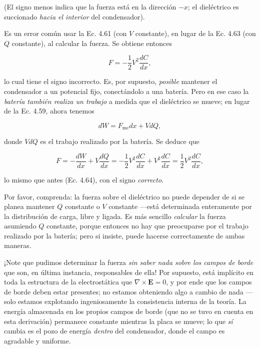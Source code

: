 \documentclass[12pt,a4paper]{report}
\newcommand{\esp}{\vspace{0.5cm}}
\begin{document}
	\esp
	
	\noindent (El signo menos indica que la fuerza está en la dirección $-x$; el dieléctrico es succionado \textit{hacia el interior} del condensador).
	
	\esp
	
	Es un error común usar la Ec. 4.61 (con $V$ constante), en lugar de la Ec. 4.63 (con $Q$ constante), al calcular la fuerza. Se obtiene entonces
	
	\esp
	
	\begin{equation*}
		F = -\frac{1}{2} V^2 \frac{dC}{dx} ,
	\end{equation*}
	
	\esp
	
	\noindent lo cual tiene el signo incorrecto. Es, por supuesto, \textit{posible} mantener el condensador a un potencial fijo, conectándolo a una batería. Pero en ese caso la \textit{batería también realiza un trabajo} a medida que el dieléctrico se mueve; en lugar de la Ec. 4.59, ahora tenemos
	
	\esp
	
	\begin{equation}
		dW = F_{\text{me}} dx + V dQ , \tag{4.66}
	\end{equation}
	
	\esp
	
	\noindent donde $V dQ$ es el trabajo realizado por la batería. Se deduce que
	
	\esp
	
	\begin{equation}
		F = -\frac{dW}{dx} + V \frac{dQ}{dx} = -\frac{1}{2} V^2 \frac{dC}{dx} + V^2 \frac{dC}{dx} = \frac{1}{2} V^2 \frac{dC}{dx} , \tag{4.67}
	\end{equation}
	
	\esp
	
	\noindent lo mismo que antes (Ec. 4.64), con el signo \textit{correcto}.
	
	\esp
	
	Por favor, comprenda: la fuerza sobre el dieléctrico no puede depender de si se planea mantener $Q$ constante o $V$ constante —está determinada enteramente por la distribución de carga, libre y ligada. Es más sencillo \textit{calcular} la fuerza asumiendo $Q$ constante, porque entonces no hay que preocuparse por el trabajo realizado por la batería; pero si insiste, puede hacerse correctamente de ambas maneras.
	
	\esp
	
	¡Note que pudimos determinar la fuerza \textit{sin saber nada sobre los campos de borde} que son, en última instancia, responsables de ella! Por supuesto, está implícito en toda la estructura de la electrostática que $\nabla \times \mathbf{E} = 0$, y por ende que los campos de borde deben estar presentes; no estamos obteniendo algo a cambio de nada —solo estamos explotando ingeniosamente la consistencia interna de la teoría. La energía almacenada en los propios campos de borde (que no se tuvo en cuenta en esta derivación) permanece constante mientras la placa se mueve; lo que \textit{sí} cambia es el pozo de energía \textit{dentro} del condensador, donde el campo es agradable y uniforme.
	

	\printbibliography[title={Bibliografía}]
\end{document}
